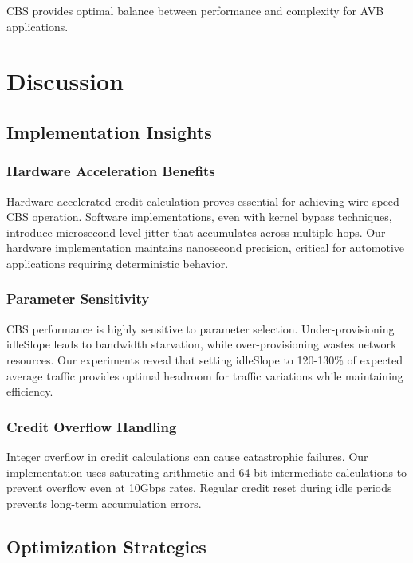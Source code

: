 \documentclass[10pt, journal, compsoc]{IEEEtran}
\begin{document}
CBS provides optimal balance between performance and complexity for AVB applications.

\section{Discussion}
\label{sec:discussion}

\subsection{Implementation Insights}

\subsubsection{Hardware Acceleration Benefits}

Hardware-accelerated credit calculation proves essential for achieving wire-speed CBS operation. Software implementations, even with kernel bypass techniques, introduce microsecond-level jitter that accumulates across multiple hops. Our hardware implementation maintains nanosecond precision, critical for automotive applications requiring deterministic behavior.

\subsubsection{Parameter Sensitivity}

CBS performance is highly sensitive to parameter selection. Under-provisioning idleSlope leads to bandwidth starvation, while over-provisioning wastes network resources. Our experiments reveal that setting idleSlope to 120-130\% of expected average traffic provides optimal headroom for traffic variations while maintaining efficiency.

\subsubsection{Credit Overflow Handling}

Integer overflow in credit calculations can cause catastrophic failures. Our implementation uses saturating arithmetic and 64-bit intermediate calculations to prevent overflow even at 10Gbps rates. Regular credit reset during idle periods prevents long-term accumulation errors.

\subsection{Optimization Strategies}
\end{document}
